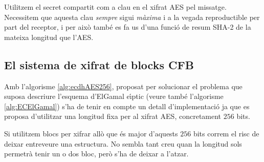 \documentclass[12pt,twoside,catalan,a4paper]{book}%
\numberwithin{figure}{section}		%
\theoremstyle{definition}   			%
\theoremstyle{saltolinea}   			%
\begin{document}
Utilitzem el secret compartit com a clau en el xifrat AES pel missatge. Necessitem que aquesta clau \emph{sempre} sigui \emph{m\`axima} i a la vegada reproductible per part del receptor, i per aix\`o tamb\'e es fa us d'una funci\'o de resum SHA-2 de la mateixa longitud que l'AES.

\subsection{El sistema de xifrat de blocks CFB}

Amb l'algorisme \ref{alg:ecdhAES256}, proposat per solucionar el problema que suposa descriure l'esquema d'ElGamal e\lgem{}\'{\i}ptic (veure tamb\'e l'algorisme \ref{alg:ECElGamal}) s'ha de tenir en compte un detall d'implementaci\'o ja que es proposa d'utilitzar una longitud fixa per al xifrat AES, concretament $256$ bits.

Si utilitzem blocs per xifrar all\`o que \'es major d'aquests $256$ bits correm el risc de deixar entreveure una estructura. No sembla tant creu quan la longitud sols permetr\`a tenir un o dos bloc, per\`o s'ha de deixar a l'atzar.
\end{document}
